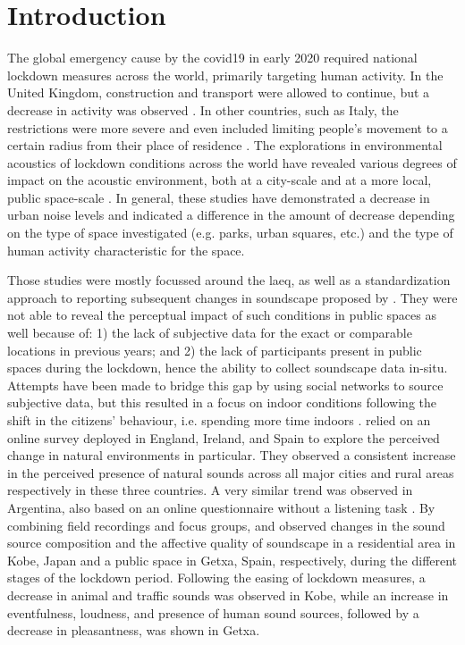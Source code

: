 \section{Introduction}
 \label{sec:intro}
 The global emergency cause by the \gls{covid19} in early 2020 required national lockdown measures across the world, primarily targeting human activity. In the United Kingdom, construction and transport were allowed to continue, but a decrease in activity was observed \citep{Hadjidemetriou2020impact}. In other countries, such as Italy, the restrictions were more severe and even included limiting people's movement to a certain radius from their place of residence \citep{Ren2020Pandemic}. The explorations in environmental acoustics of lockdown conditions across the world have revealed various degrees of impact on the acoustic environment, both at a city-scale \citep{Asensio2020Changes,BonetSola2021Soundscape,Hornberg2021Impact,Munoz2020Lockdown,Rumpler2021Noise} and at a more local, public space-scale \citep{Aletta2020Assessing,AlsinaPages2021Changes,BonetSola2021Soundscape,VidaManzano2021sound}. In general, these studies have demonstrated a decrease in urban noise levels and indicated a difference in the amount of decrease depending on the type of space investigated (e.g. parks, urban squares, etc.) and the type of human activity characteristic for the space.

 Those studies were mostly focussed around the \gls{laeq}, as well as a standardization approach to reporting subsequent changes in soundscape proposed by \citet{Asensio2020Taxonomy}. They were not able to reveal the perceptual impact of such conditions in public spaces as well because of: 1) the lack of subjective data for the exact or comparable locations in previous years; and 2) the lack of participants present in public spaces during the lockdown, hence the ability to collect soundscape data in-situ. Attempts have been made to bridge this gap by using social networks to source subjective data, but this resulted in a focus on indoor conditions following the shift in the citizens' behaviour, i.e. spending more time indoors \citep{Bartalucci2021survey,Lee2021Attitudes}. \citet{GarridoCumbrera2021Perceptions} relied on an online survey deployed in England, Ireland, and Spain to explore the perceived change in natural environments in particular. They observed a consistent increase in the perceived presence of natural sounds across all major cities and rural areas respectively in these three countries. A very similar trend was observed in Argentina, also based on an online questionnaire without a listening task \citep{Maggi2021Perception}. By combining field recordings and focus groups, \citet{Sakagami2020How} and \citet{Lenzi2021Soundscape} observed changes in the sound source composition and the affective quality of soundscape in a residential area in Kobe, Japan and a public space in Getxa, Spain, respectively, during the different stages of the lockdown period. Following the easing of lockdown measures, a decrease in animal and traffic sounds was observed in Kobe, while an increase in eventfulness, loudness, and presence of human sound sources, followed by a decrease in pleasantness, was shown in Getxa.

